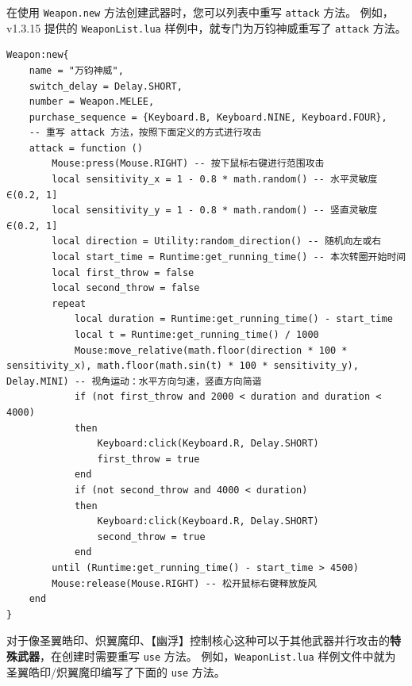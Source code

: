 在使用 \lstinline{Weapon.new} 方法创建武器时，您可以列表中重写 \lstinline{attack} 方法。
例如，v1.3.15 提供的 \lstinline{WeaponList.lua} 样例中，就专门为万钧神威重写了 \lstinline{attack} 方法。

\begin{verbatim}
Weapon:new{
    name = "万钧神威",
    switch_delay = Delay.SHORT,
    number = Weapon.MELEE,
    purchase_sequence = {Keyboard.B, Keyboard.NINE, Keyboard.FOUR},
    -- 重写 attack 方法，按照下面定义的方式进行攻击
    attack = function ()
        Mouse:press(Mouse.RIGHT) -- 按下鼠标右键进行范围攻击
        local sensitivity_x = 1 - 0.8 * math.random() -- 水平灵敏度∈(0.2, 1]
        local sensitivity_y = 1 - 0.8 * math.random() -- 竖直灵敏度∈(0.2, 1]
        local direction = Utility:random_direction() -- 随机向左或右
        local start_time = Runtime:get_running_time() -- 本次转圈开始时间
        local first_throw = false
        local second_throw = false
        repeat
            local duration = Runtime:get_running_time() - start_time
            local t = Runtime:get_running_time() / 1000
            Mouse:move_relative(math.floor(direction * 100 * sensitivity_x), math.floor(math.sin(t) * 100 * sensitivity_y), Delay.MINI) -- 视角运动：水平方向匀速，竖直方向简谐
            if (not first_throw and 2000 < duration and duration < 4000)
            then
                Keyboard:click(Keyboard.R, Delay.SHORT)
                first_throw = true
            end
            if (not second_throw and 4000 < duration)
            then
                Keyboard:click(Keyboard.R, Delay.SHORT)
                second_throw = true
            end
        until (Runtime:get_running_time() - start_time > 4500)
        Mouse:release(Mouse.RIGHT) -- 松开鼠标右键释放旋风
    end
}
\end{verbatim}

对于像圣翼皓印、炽翼魔印、【幽浮】控制核心这种可以于其他武器并行攻击的\textbf{特殊武器}，在创建时需要重写 \lstinline{use} 方法。
例如，\lstinline{WeaponList.lua} 样例文件中就为圣翼皓印/炽翼魔印编写了下面的 \lstinline{use} 方法。

